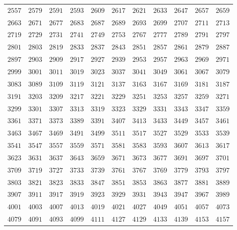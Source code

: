 \begin{table}[h!]
{\begin{tabular}{|c|c|c|c|c|c|c|c|c|c|c|}
$2557$ & $2579$ & $2591$ & $2593$ & $2609$ & $2617$ & $2621$ & $2633$ & $2647$ & $2657$ & $2659$ \\
$2663$ & $2671$ & $2677$ & $2683$ & $2687$ & $2689$ & $2693$ & $2699$ & $2707$ & $2711$ & $2713$ \\
$2719$ & $2729$ & $2731$ & $2741$ & $2749$ & $2753$ & $2767$ & $2777$ & $2789$ & $2791$ & $2797$ \\
$2801$ & $2803$ & $2819$ & $2833$ & $2837$ & $2843$ & $2851$ & $2857$ & $2861$ & $2879$ & $2887$ \\
$2897$ & $2903$ & $2909$ & $2917$ & $2927$ & $2939$ & $2953$ & $2957$ & $2963$ & $2969$ & $2971$ \\
$2999$ & $3001$ & $3011$ & $3019$ & $3023$ & $3037$ & $3041$ & $3049$ & $3061$ & $3067$ & $3079$ \\
$3083$ & $3089$ & $3109$ & $3119$ & $3121$ & $3137$ & $3163$ & $3167$ & $3169$ & $3181$ & $3187$ \\
$3191$ & $3203$ & $3209$ & $3217$ & $3221$ & $3229$ & $3251$ & $3253$ & $3257$ & $3259$ & $3271$ \\
$3299$ & $3301$ & $3307$ & $3313$ & $3319$ & $3323$ & $3329$ & $3331$ & $3343$ & $3347$ & $3359$ \\
$3361$ & $3371$ & $3373$ & $3389$ & $3391$ & $3407$ & $3413$ & $3433$ & $3449$ & $3457$ & $3461$ \\
$3463$ & $3467$ & $3469$ & $3491$ & $3499$ & $3511$ & $3517$ & $3527$ & $3529$ & $3533$ & $3539$ \\
$3541$ & $3547$ & $3557$ & $3559$ & $3571$ & $3581$ & $3583$ & $3593$ & $3607$ & $3613$ & $3617$ \\
$3623$ & $3631$ & $3637$ & $3643$ & $3659$ & $3671$ & $3673$ & $3677$ & $3691$ & $3697$ & $3701$ \\
$3709$ & $3719$ & $3727$ & $3733$ & $3739$ & $3761$ & $3767$ & $3769$ & $3779$ & $3793$ & $3797$ \\
$3803$ & $3821$ & $3823$ & $3833$ & $3847$ & $3851$ & $3853$ & $3863$ & $3877$ & $3881$ & $3889$ \\
$3907$ & $3911$ & $3917$ & $3919$ & $3923$ & $3929$ & $3931$ & $3943$ & $3947$ & $3967$ & $3989$ \\
$4001$ & $4003$ & $4007$ & $4013$ & $4019$ & $4021$ & $4027$ & $4049$ & $4051$ & $4057$ & $4073$ \\
$4079$ & $4091$ & $4093$ & $4099$ & $4111$ & $4127$ & $4129$ & $4133$ & $4139$ & $4153$ & $4157$ \\
\hline
\end{tabular}
}
\end{table}

